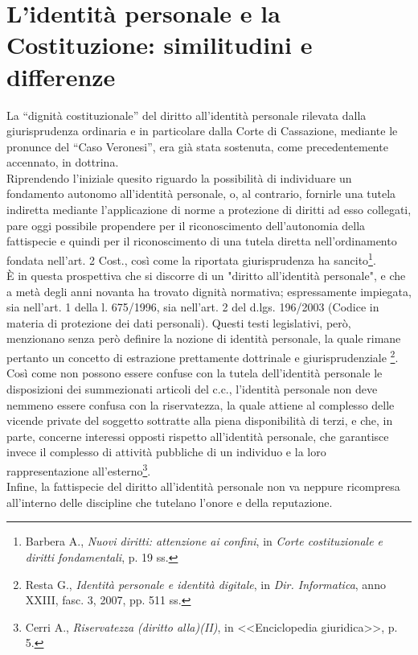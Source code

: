 \section{L'identità personale e la Costituzione: similitudini e differenze}
La “dignità costituzionale” del diritto all’identità personale rilevata dalla giurisprudenza ordinaria e in particolare dalla Corte di Cassazione, mediante le pronunce del “Caso Veronesi”, era già stata sostenuta, come precedentemente accennato, in dottrina. 
\\Riprendendo l'iniziale quesito riguardo la possibilità di individuare un fondamento autonomo all’identità personale, o, al contrario, fornirle una tutela indiretta mediante l'applicazione di norme a protezione di diritti ad esso collegati, pare oggi possibile propendere per il riconoscimento dell’autonomia della fattispecie e quindi per il riconoscimento di una tutela diretta nell’ordinamento fondata nell’art. 2 Cost., così come la riportata giurisprudenza ha sancito\footnote{Barbera A., \textit{Nuovi diritti: attenzione ai confini}, in \textit{Corte costituzionale e diritti fondamentali}, p. 19 ss.}. 
\\È in questa prospettiva che si discorre di un "diritto all'identità personale", e che a metà degli anni novanta ha trovato dignità normativa; espressamente impiegata, sia nell'art. 1 della l. 675/1996, sia nell'art. 2 del d.lgs. 196/2003 (Codice in materia di protezione dei dati personali). Questi testi  legislativi, però, menzionano senza però definire la nozione di identità personale, la quale rimane pertanto un concetto di estrazione prettamente dottrinale e giurisprudenziale \footnote{Resta G., \textit{Identità personale e identità digitale}, in \textit{Dir. Informatica}, anno XXIII, fasc. 3, 2007, pp. 511 ss.}. 
\\Così come non possono essere confuse con la tutela dell'identità personale le disposizioni dei summezionati articoli del c.c., l’identità personale non deve nemmeno essere confusa con la riservatezza, la quale attiene al complesso delle vicende private del soggetto sottratte alla piena disponibilità di terzi, e che, in parte, concerne interessi opposti rispetto all’identità personale, che garantisce invece il complesso di attività pubbliche di un individuo e la loro rappresentazione all'esterno\footnote{Cerri A., \textit{Riservatezza (diritto alla)(II)}, in <<Enciclopedia giuridica>>, p. 5.}.
\\Infine, la fattispecie del diritto all’identità personale non va neppure ricompresa all’interno delle discipline che tutelano l’onore e della reputazione.

